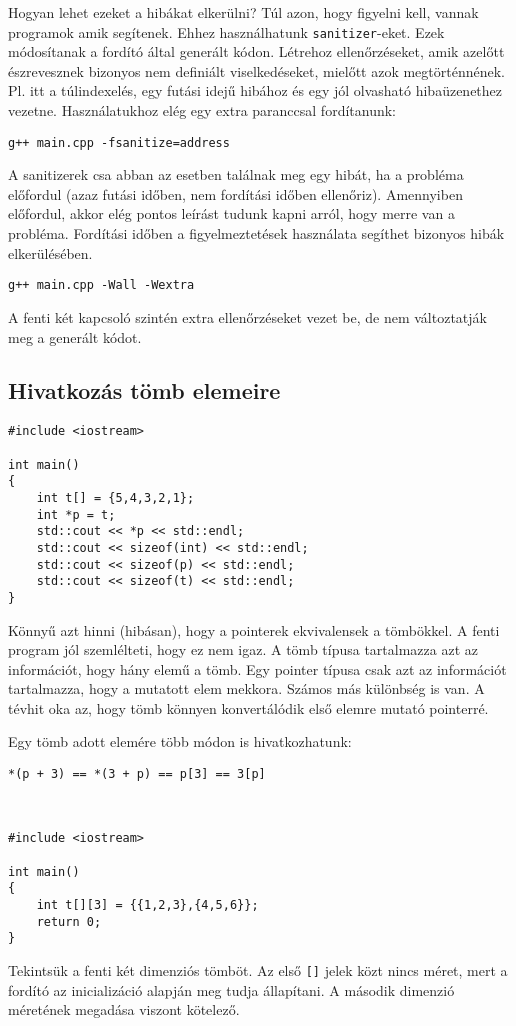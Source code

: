 \documentclass[a4paper,11.5pt,table]{article}
\begin{document}
		Hogyan lehet ezeket a hibákat elkerülni? Túl azon, hogy figyelni kell, vannak programok amik segítenek. Ehhez használhatunk \texttt{sanitizer}-eket. Ezek módosítanak a fordító által generált kódon. Létrehoz ellenőrzéseket, amik azelőtt észrevesznek bizonyos nem definiált viselkedéseket, mielőtt azok megtörténnének. Pl. itt a túlindexelés, egy futási idejű hibához és egy jól olvasható hibaüzenethez vezetne. Használatukhoz elég egy extra paranccsal fordítanunk:
		
		{\centering\texttt{g++ main.cpp -fsanitize=address}\par }
		
		A sanitizerek csa abban az esetben találnak meg egy hibát, ha a probléma előfordul (azaz futási időben, nem fordítási időben ellenőriz). Amennyiben előfordul, akkor elég pontos leírást tudunk kapni arról, hogy merre van a probléma. Fordítási időben a figyelmeztetések használata segíthet bizonyos hibák elkerülésében.
		
		{\centering \texttt{g++ main.cpp -Wall -Wextra} \par}
		
		A fenti két kapcsoló szintén extra ellenőrzéseket vezet be, de nem változtatják meg a generált kódot.
	\subsection{Hivatkozás tömb elemeire}
		\begin{lstlisting}
#include <iostream>

int main()
{
	int t[] = {5,4,3,2,1};
	int *p = t;
	std::cout << *p << std::endl;
	std::cout << sizeof(int) << std::endl;
	std::cout << sizeof(p) << std::endl;
	std::cout << sizeof(t) << std::endl;
}
		\end{lstlisting}
		Könnyű azt hinni (hibásan), hogy a pointerek ekvivalensek a tömbökkel. A fenti program jól szemlélteti, hogy ez nem igaz. A tömb típusa tartalmazza azt az információt, hogy hány elemű a tömb. Egy pointer típusa csak azt az információt tartalmazza, hogy a mutatott elem mekkora. Számos más különbség is van. A tévhit oka az, hogy tömb könnyen konvertálódik első elemre mutató pointerré.
		
		Egy tömb adott elemére több módon is hivatkozhatunk:
		
		{\centering \texttt{*(p + 3) == *(3 + p) == p[3] == 3[p]} \par}
		\
		\begin{lstlisting}
#include <iostream>

int main()
{
	int t[][3] = {{1,2,3},{4,5,6}};
	return 0;
}
		\end{lstlisting}
		Tekintsük a fenti két dimenziós tömböt. Az első \texttt{[]} jelek közt nincs méret, mert a fordító az inicializáció alapján meg tudja állapítani. A második dimenzió méretének megadása viszont kötelező.
		
\end{document}
